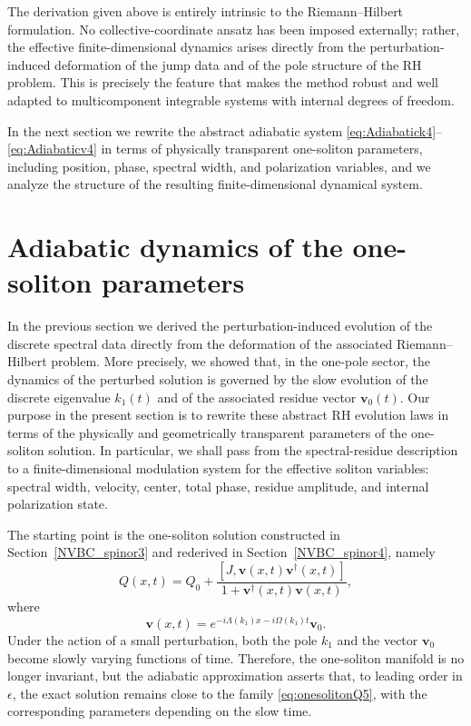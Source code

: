 \documentclass[11pt]{amsart}
\theoremstyle{definition}
\numberwithin{equation}{section}
\begin{document}
The derivation given above is entirely intrinsic to the Riemann--Hilbert formulation. No collective-coordinate ansatz has been imposed externally; rather, the effective finite-dimensional dynamics arises directly from the perturbation-induced deformation of the jump data and of the pole structure of the RH problem. This is precisely the feature that makes the method robust and well adapted to multicomponent integrable systems with internal degrees of freedom.

In the next section we rewrite the abstract adiabatic system \eqref{eq:Adiabatick4}--\eqref{eq:Adiabaticv4} in terms of physically transparent one-soliton parameters, including position, phase, spectral width, and polarization variables, and we analyze the structure of the resulting finite-dimensional dynamical system.
\section{Adiabatic dynamics of the one-soliton parameters}
\label{NVBC_spinor5}

In the previous section we derived the perturbation-induced evolution of the discrete spectral data directly from the deformation of the associated Riemann--Hilbert problem. More precisely, we showed that, in the one-pole sector, the dynamics of the perturbed solution is governed by the slow evolution of the discrete eigenvalue $k_1(t)$ and of the associated residue vector $\mathbf{v}_0(t)$. Our purpose in the present section is to rewrite these abstract RH evolution laws in terms of the physically and geometrically transparent parameters of the one-soliton solution. In particular, we shall pass from the spectral-residue description to a finite-dimensional modulation system for the effective soliton variables: spectral width, velocity, center, total phase, residue amplitude, and internal polarization state.

The starting point is the one-soliton solution constructed in Section~\ref{NVBC_spinor3} and rederived in Section~\ref{NVBC_spinor4}, namely
\begin{equation}
Q(x,t)=Q_0+\frac{[J,\mathbf{v}(x,t)\mathbf{v}^\dagger(x,t)]}{1+\mathbf{v}^\dagger(x,t)\mathbf{v}(x,t)},
\label{eq:onesolitonQ5}
\end{equation}
where
\begin{equation}
\mathbf{v}(x,t)=e^{-i\Lambda(k_1)x-i\Omega(k_1)t}\mathbf{v}_0.
\label{eq:vxt5}
\end{equation}
Under the action of a small perturbation, both the pole $k_1$ and the vector $\mathbf{v}_0$ become slowly varying functions of time. Therefore, the one-soliton manifold is no longer invariant, but the adiabatic approximation asserts that, to leading order in $\epsilon$, the exact solution remains close to the family \eqref{eq:onesolitonQ5}, with the corresponding parameters depending on the slow time.
\end{document}
